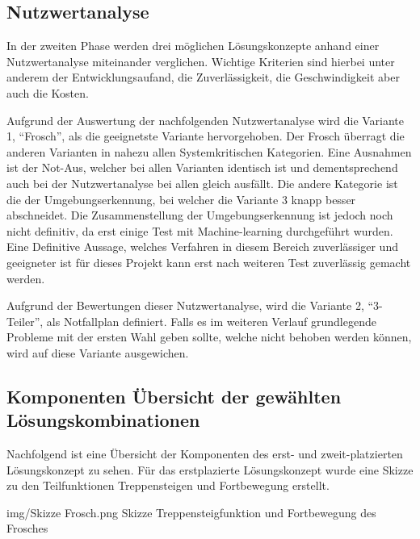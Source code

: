 


\subsection{Nutzwertanalyse}
In der zweiten Phase werden drei möglichen Lösungskonzepte anhand einer Nutzwertanalyse miteinander verglichen. Wichtige Kriterien sind hierbei unter anderem der Entwicklungsaufand, die Zuverlässigkeit, die Geschwindigkeit aber auch die Kosten. 

Aufgrund der Auswertung der nachfolgenden Nutzwertanalyse wird die Variante 1, ``Frosch'', als die geeignetste Variante hervorgehoben. Der Frosch überragt die anderen Varianten in nahezu allen Systemkritischen Kategorien. Eine Ausnahmen ist der Not-Aus, welcher bei allen Varianten identisch ist und dementsprechend auch bei der Nutzwertanalyse bei allen gleich ausfällt. Die andere Kategorie ist die der Umgebungserkennung, bei welcher die Variante 3 knapp besser abschneidet. Die Zusammenstellung der Umgebungserkennung ist jedoch noch nicht definitiv, da erst einige Test mit Machine-learning durchgeführt wurden. Eine Definitive Aussage, welches Verfahren in diesem Bereich zuverlässiger und geeigneter ist für dieses Projekt kann erst nach weiteren Test zuverlässig gemacht werden.

Aufgrund der Bewertungen dieser Nutzwertanalyse, wird die Variante 2, ``3-Teiler'', als Notfallplan definiert. Falls es im weiteren Verlauf grundlegende Probleme mit der ersten Wahl geben sollte, welche nicht behoben werden können, wird auf diese Variante ausgewichen.




\subsection{Komponenten Übersicht der gewählten Lösungskombinationen}
Nachfolgend ist eine Übersicht der Komponenten des erst- und zweit-platzierten Lösungskonzept zu sehen. Für das erstplazierte Lösungskonzept wurde eine Skizze zu den Teilfunktionen Treppensteigen und Fortbewegung erstellt.


\vspace{3cm}

\image
   {img/Skizze Frosch.png}
   {Skizze Treppensteigfunktion und Fortbewegung des Frosches}

